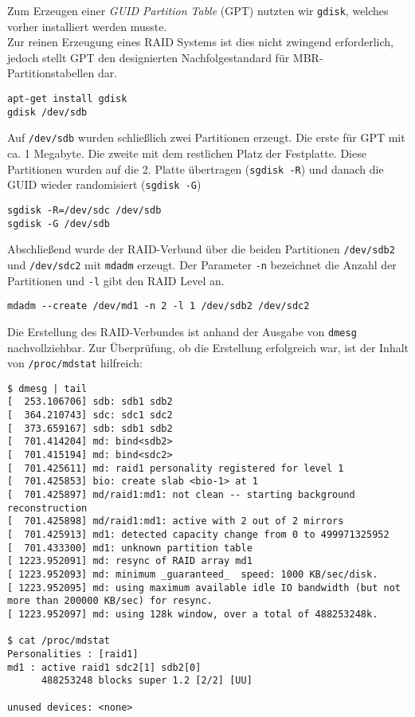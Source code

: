 Zum Erzeugen einer \emph{GUID Partition Table} (GPT) nutzten wir \verb#gdisk#, welches vorher installiert werden musste. \\ 
Zur reinen Erzeugung eines RAID Systems ist dies nicht zwingend erforderlich, jedoch stellt GPT den designierten Nachfolgestandard für MBR-Partitionstabellen dar. 
\begin{verbatim}
apt-get install gdisk
gdisk /dev/sdb
\end{verbatim}
Auf \verb#/dev/sdb# wurden schließlich zwei Partitionen erzeugt. Die erste für GPT mit ca. 1 Megabyte. Die zweite mit dem restlichen Platz der Festplatte.
Diese Partitionen wurden auf die 2. Platte übertragen (\verb#sgdisk -R#) und danach die GUID wieder randomisiert (\verb#sgdisk -G#)
\begin{verbatim}
sgdisk -R=/dev/sdc /dev/sdb
sgdisk -G /dev/sdb
\end{verbatim}
Abschließend wurde der RAID-Verbund über die beiden Partitionen \verb#/dev/sdb2# und \verb#/dev/sdc2# mit \verb#mdadm# erzeugt. Der Parameter \verb#-n# bezeichnet die Anzahl der Partitionen und \verb#-l# gibt den RAID Level an.
\begin{verbatim}
mdadm --create /dev/md1 -n 2 -l 1 /dev/sdb2 /dev/sdc2
\end{verbatim}
Die Erstellung des RAID-Verbundes ist anhand der Ausgabe von \verb#dmesg# nachvollziehbar. Zur Überprüfung, ob die Erstellung erfolgreich war, ist der Inhalt von \verb#/proc/mdstat# hilfreich: 
\setupVerbatimOut
\begin{verbatim}
$ dmesg | tail
[  253.106706] sdb: sdb1 sdb2
[  364.210743] sdc: sdc1 sdc2
[  373.659167] sdb: sdb1 sdb2
[  701.414204] md: bind<sdb2>
[  701.415194] md: bind<sdc2>
[  701.425611] md: raid1 personality registered for level 1
[  701.425853] bio: create slab <bio-1> at 1
[  701.425897] md/raid1:md1: not clean -- starting background reconstruction
[  701.425898] md/raid1:md1: active with 2 out of 2 mirrors
[  701.425913] md1: detected capacity change from 0 to 499971325952
[  701.433300] md1: unknown partition table
[ 1223.952091] md: resync of RAID array md1
[ 1223.952093] md: minimum _guaranteed_  speed: 1000 KB/sec/disk.
[ 1223.952095] md: using maximum available idle IO bandwidth (but not more than 200000 KB/sec) for resync.
[ 1223.952097] md: using 128k window, over a total of 488253248k.

$ cat /proc/mdstat
Personalities : [raid1] 
md1 : active raid1 sdc2[1] sdb2[0]
      488253248 blocks super 1.2 [2/2] [UU]
      
unused devices: <none>
\end{verbatim}

